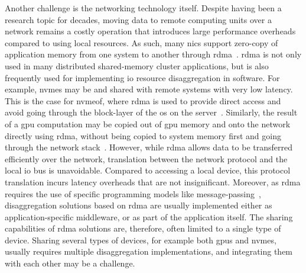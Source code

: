 Another challenge is the networking technology itself. 
%
Despite having been a research topic for decades, moving data to remote computing units over a network remains a costly operation that introduces large performance overheads compared to using local resources.
%
As such, many \glspl{nic} support zero-copy of application memory from one system to another through \gls{rdma}~\cite{Huang2012}.
%
\Gls{rdma} is not only used in many distributed shared-memory cluster applications, but is also frequently used for implementing \gls{io} resource \gls{disaggregation} in software.
%
For example, \glspl{nvme} may be  and shared with remote systems with very low latency.
This is the case for \gls{nvmeof}, where \gls{rdma} is used to provide direct access and avoid going through the block-layer of the \gls{os} on the server~\cite{Guz2018}.
%
Similarly, the result of a \gls{gpu} computation may be copied out of \gls{gpu} memory and onto the network directly using \gls{rdma}, without being copied to system memory first and going through the network stack~\cite{Venkatesh2014}.
%
However, while \gls{rdma} allows data to be transferred efficiently over the network, translation between the network protocol and the local \gls{io} bus is unavoidable. 
%
Compared to accessing a local device, this protocol translation incurs latency overheads that are not insignificant.
%
Moreover, as \gls{rdma} requires the use of specific programming models like message-passing~\cite{Jiang2004}, \gls{disaggregation} solutions based on \gls{rdma} are usually implemented either as application-specific \gls{middleware}, or as part of the application itself.
%
The sharing capabilities of \gls{rdma} solutions are, therefore, often limited to a single type of device.
Sharing several types of devices, for example both \glspl{gpu} and \glspl{nvme}, usually requires multiple \gls{disaggregation} implementations, and integrating them with each other may be a challenge.



